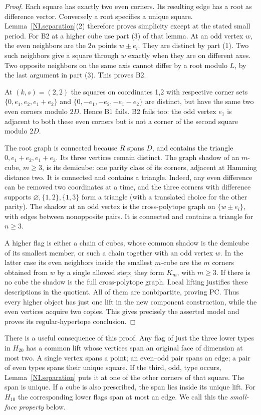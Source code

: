 \begin{proof}
Each square has exactly two even corners. Its resulting edge has
a root as difference vector. Conversely a root specifies a unique
square. Lemma~\ref{NI.separation}(2) therefore proves simplicity except
at the stated small period. For B2 at a higher cube use part (3) of
that lemma. At an odd vertex $w$, the even neighbors are the $2n$
points $w\pm e_i$. They are distinct by part (1). Two such neighbors
give a square through $w$ exactly when they are on different axes.
Two opposite neighbors on the same axis cannot differ by a root
modulo $L$, by the last argument in part (3). This proves B2.

At $(k,s)=(2,2)$ the squares on coordinates 1,2 with respective
corner sets $\{0,e_1,e_2,e_1+e_2\}$ and
$\{0,-e_1,-e_2,-e_1-e_2\}$ are distinct, but have the same
two even corners modulo $2D$. Hence B1 fails. B2 fails too:
the odd vertex $e_1$ is adjacent to both these even corners but
is not a corner of the second square modulo $2D$.

The root graph is connected because $R$ spans $D$, and contains
the triangle $0,e_1+e_2,e_1+e_3$. Its three vertices remain
distinct. The graph shadow of an $m$-cube, $m\ge3$, is its
demicube: one parity class of its corners, adjacent at Hamming
distance two. It is connected and contains a triangle. Indeed,
any even difference can be removed two coordinates at a time,
and the three corners with difference supports
$\varnothing,\{1,2\},\{1,3\}$ form a triangle (with a translated
choice for the other parity). The shadow at an odd vertex is the
cross-polytope graph on $\{w\pm e_i\}$, with edges between
nonopposite pairs. It is connected and contains a triangle for
$n\ge3$.

A higher flag is either a chain of cubes, whose common shadow is
the demicube of its smallest member, or such a chain together
with an odd vertex $w$. In the latter case its even neighbors
inside the smallest $m$-cube are the $m$ corners obtained from
$w$ by a single allowed step; they form $K_m$, with $m\ge3$.
If there is no cube the shadow is the full cross-polytope graph.
Local lifting justifies these descriptions in the quotient. All
of them are nonbipartite, proving PC. Thus every higher object has
just one lift in the new component construction, while the even
vertices acquire two copies. This gives precisely the asserted
model and proves its regular-hypertope conclusion.
\end{proof}

There is a useful consequence of this proof. Any flag of just the
three lower types in $H_{20}$ has a common lift whose vertices span
an original face of dimension at most two. A single vertex spans a
point; an even--odd pair spans an edge; a pair of even types spans
their unique square. If the third, odd, type occurs, Lemma~\ref{NI.separation}
puts it at one of the other corners of that square. The span is
unique. If a cube is also prescribed, the span lies inside its
unique lift. For $H_{10}$ the corresponding lower flags span at
most an edge. We call this the \emph{small-face property} below.

